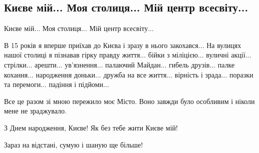  
 
 
 
 

\subsection{Києве мій... Моя столиця... Мій центр всесвіту...}
\label{sec:29_05_2021.tg.mosijchuk_igor.1.kiev}

Києве мій... Моя столиця... Мій центр всесвіту...

В 15 років я вперше приїхав до Києва і зразу в нього закохався... На вулицях
нашої столиці я пізнавав гірку правду життя... бійки з міліцією... вуличні
акції... стрілки... арешти... ув'язнення... палаючий Майдан... гибель друзів...
палке кохання... народження доньки... дружба на все життя... вірність і
зрада... поразки та перемоги... падіння і підйоми...

Все це разом зі мною пережило моє Місто. Воно завжди було особливим і ніколи
мене не зраджувало.

З Днем народження, Києве! Як без тебе жити Києве мій!

Зараз на відстані, сумую і шаную ще більше!
